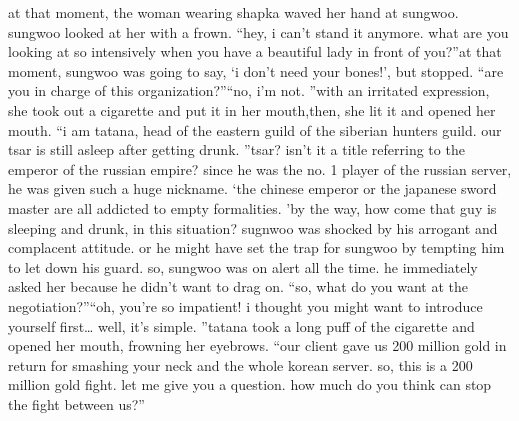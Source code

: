 at that moment, the woman wearing shapka waved her hand at sungwoo.
 sungwoo looked at her with a frown.
“hey, i can’t stand it anymore.
 what are you looking at so intensively when you have a beautiful lady in front of you?”at that moment, sungwoo was going to say, ‘i don’t need your bones!’, but stopped.
“are you in charge of this organization?”“no, i’m not.
”with an irritated expression, she took out a cigarette and put it in her mouth,then, she lit it and opened her mouth.
“i am tatana, head of the eastern guild of the siberian hunters guild.
 our tsar is still asleep after getting drunk.
”tsar? isn’t it a title referring to the emperor of the russian empire? since he was the no.
 1 player of the russian server, he was given such a huge nickname.
‘the chinese emperor or the japanese sword master are all addicted to empty formalities.
’by the way, how come that guy is sleeping and drunk, in this situation? sugnwoo was shocked by his arrogant and complacent attitude.
or he might have set the trap for sungwoo by tempting him to let down his guard.
 so, sungwoo was on alert all the time.
he immediately asked her because he didn’t want to drag on.
“so, what do you want at the negotiation?”“oh, you’re so impatient! i thought you might want to introduce yourself first… well, it’s simple.
”tatana took a long puff of the cigarette and opened her mouth, frowning her eyebrows.
“our client gave us 200 million gold in return for smashing your neck and the whole korean server.
 so, this is a 200 million gold fight.
 let me give you a question.
 how much do you think can stop the fight between us?”

 